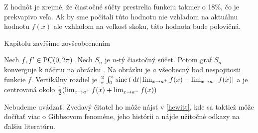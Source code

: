 Z hodnôt je zrejmé, že čiastočné súčty prestrelia funkciu takmer o
18\%, čo je prekvapivo veľa. Ak by sme počítali túto hodnotu nie
vzhľadom na aktuálnu hodnotu $f(x)$ ale vzhľadom na veľkosť skoku,
táto hodnota bude polovičná. 

Kapitolu zavŕšime zovšeobecnením
\begin{veta}
    Nech $f,f'\in\mbox{PC}(0,2\pi)$. Nech $S_n$ je $n$-tý čiastočný súčet.
    Potom graf $S_n$ konverguje k náčrtu na obrázku
    .
    Na obrázku je $a$ všeobecný bod nespojitosti funkcie $f$.
    Vertikálny rozdiel je $\frac{2}{\pi} \int_0^{\pi} \operatorname{sinc} t \; \mathrm{d} t
    |\lim_{x\rightarrow a^+} f(x) - \lim_{x\rightarrow a^-} f(x)|$ a je
    centrovaná okolo 
    $\frac{1}{2}(\lim_{x\rightarrow a^+} f(x) + \lim_{x\rightarrow a^-} f(x))$
\end{veta}
\begin{dokaz}
    Nebudeme uvádzať. Zvedavý čitateľ ho môže nájsť v \ref{hewitt},
    kde sa taktiež môže dočítať viac o Gibbsovom fenoméne, jeho
    histórii a nájde užitočné odkazy na ďalšiu literatúru.
\end{dokaz}
